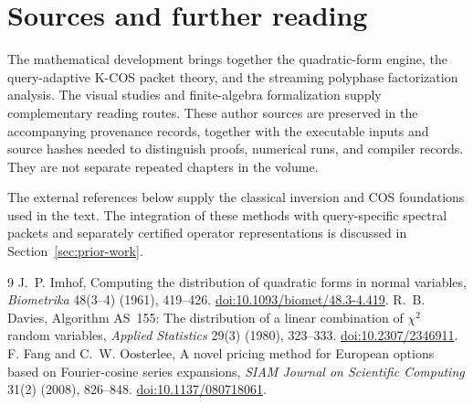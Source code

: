 \backmatter
\chapter{Sources and further reading}
The mathematical development brings together the quadratic-form engine,
the query-adaptive K-COS packet theory, and the streaming polyphase
factorization analysis. The visual studies and finite-algebra formalization
supply complementary reading routes. These author sources are preserved in
the accompanying provenance records, together with the executable inputs and
source hashes needed to distinguish proofs, numerical runs, and compiler
records. They are not separate repeated chapters in the volume.

The external references below supply the classical inversion and COS
foundations used in the text. The integration of these methods with
query-specific spectral packets and separately certified operator
representations is discussed in Section~\ref{sec:prior-work}.

\patchcmd{\thebibliography}{\chapter*{\bibname}}{\section*{\bibname}}{}{}
\begin{thebibliography}{9}
 J.~P. Imhof, Computing the distribution of quadratic forms
in normal variables, \emph{Biometrika} 48(3--4) (1961), 419--426.
\href{https://doi.org/10.1093/biomet/48.3-4.419}{doi:10.1093/biomet/48.3-4.419}.
 R.~B. Davies, Algorithm AS~155: The distribution of a
linear combination of $\chi^2$ random variables,
\emph{Applied Statistics} 29(3) (1980), 323--333.
\href{https://doi.org/10.2307/2346911}{doi:10.2307/2346911}.
 F. Fang and C.~W. Oosterlee, A novel pricing
method for European options based on Fourier-cosine series expansions,
\emph{SIAM Journal on Scientific Computing} 31(2) (2008), 826--848.
\href{https://doi.org/10.1137/080718061}{doi:10.1137/080718061}.
\end{thebibliography}